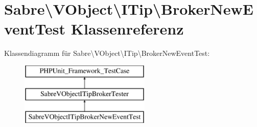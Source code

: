 \hypertarget{class_sabre_1_1_v_object_1_1_i_tip_1_1_broker_new_event_test}{}\section{Sabre\textbackslash{}V\+Object\textbackslash{}I\+Tip\textbackslash{}Broker\+New\+Event\+Test Klassenreferenz}
\label{class_sabre_1_1_v_object_1_1_i_tip_1_1_broker_new_event_test}
Klassendiagramm für Sabre\textbackslash{}V\+Object\textbackslash{}I\+Tip\textbackslash{}Broker\+New\+Event\+Test\+:\begin{figure}[H]
\begin{center}
\leavevmode
\includegraphics[height=3.000000cm]{class_sabre_1_1_v_object_1_1_i_tip_1_1_broker_new_event_test}
\end{center}
\end{figure}
